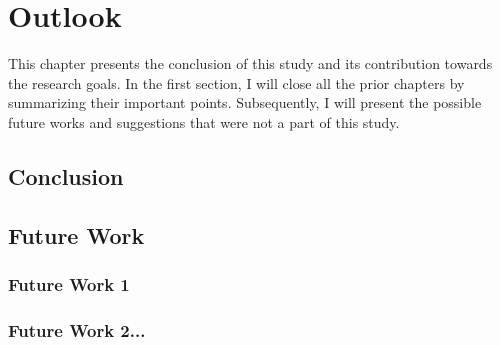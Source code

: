 \chapter{Outlook}
\label{cha:outlook}

This chapter presents the conclusion of this study and its contribution towards the research goals. In the first section, I will close all the prior chapters by summarizing their important points. Subsequently, I will present the possible future works and suggestions that were not a part of this study.

\section{Conclusion}


\section{Future Work}


\subsection{Future Work 1}


\subsection{Future Work 2...}
